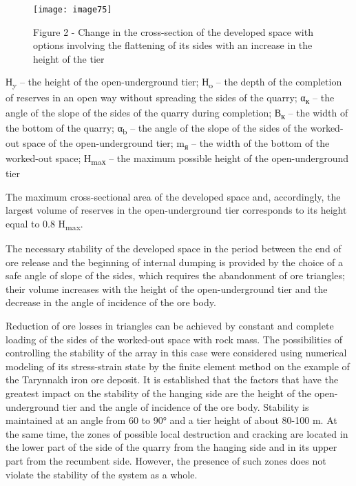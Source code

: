 \begin{figure}[H]
    \centering
    \texttt{[image: image75]}
    \caption*{Figure 2 - Change in the cross-section of the developed space with
options involving the flattening of its sides with an increase in the
height of the tier}
\end{figure}

\begin{multicols}{2}
Н\textsubscript{y} -- the height of the open-underground tier;
Н\textsubscript{o} -- the depth of the completion of reserves in an open
way without spreading the sides of the quarry; α\textsubscript{к} -- the
angle of the slope of the sides of the quarry during completion;
В\textsubscript{к} -- the width of the bottom of the quarry;
α\textsubscript{b} -- the angle of the slope of the sides of the
worked-out space of the open-underground tier; m\textsubscript{я} -- the
width of the bottom of the worked-out space; Н\textsubscript{maх} -- the
maximum possible height of the open-underground tier

The maximum cross-sectional area of the developed space and,
accordingly, the largest volume of reserves in the open-underground tier
corresponds to its height equal to 0.8 H\textsubscript{max}.

The necessary stability of the developed space in the period between the
end of ore release and the beginning of internal dumping is provided by
the choice of a safe angle of slope of the sides, which requires the
abandonment of ore triangles; their volume increases with the height of
the open-underground tier and the decrease in the angle of incidence of
the ore body.

Reduction of ore losses in triangles can be achieved by constant and
complete loading of the sides of the worked-out space with rock mass.
The possibilities of controlling the stability of the array in this case
were considered using numerical modeling of its stress-strain state by
the finite element method on the example of the Tarynnakh iron ore
deposit. It is established that the factors that have the greatest
impact on the stability of the hanging side are the height of the
open-underground tier and the angle of incidence of the ore body.
Stability is maintained at an angle from 60 to 90° and a tier height of
about 80-100 m. At the same time, the zones of possible local
destruction and cracking are located in the lower part of the side of
the quarry from the hanging side and in its upper part from the
recumbent side. However, the presence of such zones does not violate the
stability of the system as a whole.


\end{multicols}
